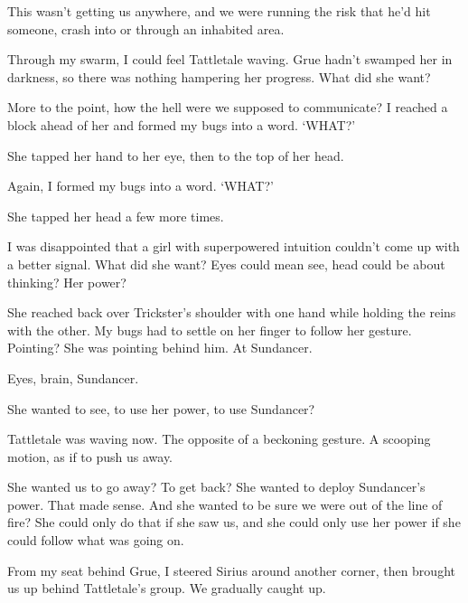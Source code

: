 This wasn't getting us anywhere, and we were running the risk that he'd hit someone, crash into or through an inhabited area.



Through my swarm, I could feel Tattletale waving.  Grue hadn't swamped her in darkness, so there was nothing hampering her progress.  What did she want?



More to the point, how the hell were we supposed to communicate?  I reached a block ahead of her and formed my bugs into a word.  `WHAT?'



She tapped her hand to her eye, then to the top of her head.



Again, I formed my bugs into a word.  `WHAT?'



She tapped her head a few more times.



I was disappointed that a girl with superpowered intuition couldn't come up with a better signal.  What did she want?  Eyes could mean see, head could be about thinking?  Her power?



She reached back over Trickster's shoulder with one hand while holding the reins with the other.  My bugs had to settle on her finger to follow her gesture.  Pointing?  She was pointing behind him.  At Sundancer.



Eyes, brain, Sundancer.



She wanted to see, to use her power, to use Sundancer?



Tattletale was waving now.  The opposite of a beckoning gesture.  A scooping motion, as if to push us away.



She wanted us to go away?  To get back?  She wanted to deploy Sundancer's power.  That made sense.  And she wanted to be sure we were out of the line of fire?  She could only do that if she saw us, and she could only use her power if she could follow what was going on.



From my seat behind Grue, I steered Sirius around another corner, then brought us up behind Tattletale's group.  We gradually caught up.




